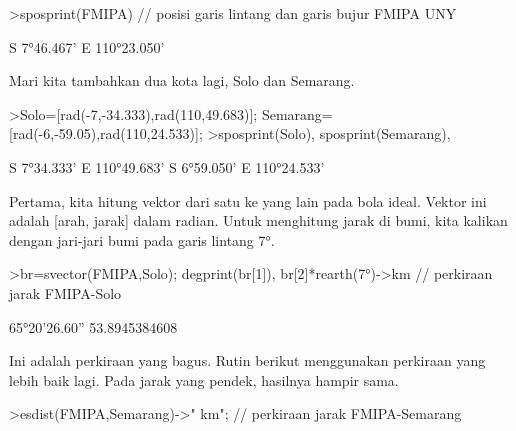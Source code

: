 \documentclass[a4paper,10pt]{article}
\begin{document}
\begin{eulernotebook}
\begin{eulercomment}
\begin{eulercomment}
\begin{eulercomment}
\begin{eulercomment}
\begin{eulercomment}
\begin{eulercomment}
\begin{eulercomment}
\begin{eulercomment}
\begin{eulercomment}
\begin{eulercomment}
\begin{eulercomment}
\begin{eulercomment}
\begin{eulercomment}
\begin{eulercomment}
\begin{eulercomment}
\begin{eulercomment}
\begin{eulercomment}
\begin{eulercomment}
\begin{eulercomment}
\begin{eulercomment}
\begin{eulercomment}
\begin{eulercomment}
\begin{eulercomment}
\begin{eulercomment}
\begin{eulercomment}
\begin{eulercomment}
\begin{eulercomment}
\begin{eulercomment}
\begin{eulercomment}
\begin{eulercomment}
\begin{eulerprompt}
>sposprint(FMIPA) // posisi garis lintang dan garis bujur FMIPA UNY
\end{eulerprompt}
\begin{euleroutput}
  S 7°46.467' E 110°23.050'
\end{euleroutput}
\begin{eulercomment}
Mari kita tambahkan dua kota lagi, Solo dan Semarang.
\end{eulercomment}
\begin{eulerprompt}
>Solo=[rad(-7,-34.333),rad(110,49.683)]; Semarang=[rad(-6,-59.05),rad(110,24.533)];
>sposprint(Solo), sposprint(Semarang),
\end{eulerprompt}
\begin{euleroutput}
  S 7°34.333' E 110°49.683'
  S 6°59.050' E 110°24.533'
\end{euleroutput}
\begin{eulercomment}
Pertama, kita hitung vektor dari satu ke yang lain pada bola ideal.
Vektor ini adalah [arah, jarak] dalam radian. Untuk menghitung jarak
di bumi, kita kalikan dengan jari-jari bumi pada garis lintang 7°.
\end{eulercomment}
\begin{eulerprompt}
>br=svector(FMIPA,Solo); degprint(br[1]), br[2]*rearth(7°)->km // perkiraan jarak FMIPA-Solo
\end{eulerprompt}
\begin{euleroutput}
  65°20'26.60''
  53.8945384608
\end{euleroutput}
\begin{eulercomment}
Ini adalah perkiraan yang bagus. Rutin berikut menggunakan perkiraan
yang lebih baik lagi. Pada jarak yang pendek, hasilnya hampir sama.
\end{eulercomment}
\begin{eulerprompt}
>esdist(FMIPA,Semarang)->" km"; // perkiraan jarak FMIPA-Semarang
\end{eulerprompt}
\begin{eulercomment}

\end{eulercomment}
\end{eulercomment}
\end{eulercomment}
\end{eulercomment}
\end{eulercomment}
\end{eulercomment}
\end{eulercomment}
\end{eulercomment}
\end{eulercomment}
\end{eulercomment}
\end{eulercomment}
\end{eulercomment}
\end{eulercomment}
\end{eulercomment}
\end{eulercomment}
\end{eulercomment}
\end{eulercomment}
\end{eulercomment}
\end{eulercomment}
\end{eulercomment}
\end{eulercomment}
\end{eulercomment}
\end{eulercomment}
\end{eulercomment}
\end{eulercomment}
\end{eulercomment}
\end{eulercomment}
\end{eulercomment}
\end{eulercomment}
\end{eulercomment}
\end{eulercomment}
\end{eulernotebook}
\end{document}
